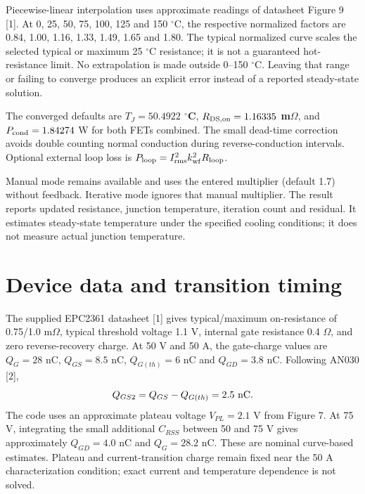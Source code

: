 \documentclass[11pt,a4paper]{article}
\begin{document}
Piecewise-linear interpolation uses approximate readings of datasheet Figure 9 [1].
At 0, 25, 50, 75, 100, 125 and 150 $^\circ$C, the respective normalized factors are
0.84, 1.00, 1.16, 1.33, 1.49, 1.65 and 1.80.
The typical normalized curve scales the selected typical or maximum 25 $^\circ$C
resistance; it is not a guaranteed hot-resistance limit. No extrapolation is made
outside 0--150 $^\circ$C. Leaving that range or failing to converge produces an
explicit error instead of a reported steady-state solution.

The converged defaults are \textbf{$T_J=50.4922$ $^\circ$C},
\textbf{$R_{\rm DS,on}=1.16335$ m$\Omega$}, and $P_{\rm cond}=1.84274$ W
for both FETs combined. The small dead-time correction avoids double counting
normal conduction during reverse-conduction intervals. Optional external loop loss
is $P_{\rm loop}=I_{\rm rms}^{2}k_{\rm wf}^{2}R_{\rm loop}$.

Manual mode remains available and uses the entered multiplier (default 1.7) without
feedback. Iterative mode ignores that manual multiplier. The result reports updated
resistance, junction temperature, iteration count and residual. It estimates
steady-state temperature under the specified cooling conditions; it does not measure
actual junction temperature.

\newpage
\section{Device data and transition timing}
The supplied EPC2361 datasheet [1] gives typical/maximum on-resistance of
0.75/1.0 m$\Omega$, typical threshold voltage 1.1 V, internal gate resistance
0.4 $\Omega$, and zero reverse-recovery charge. At 50 V and 50 A, the gate-charge
values are $Q_G=28$ nC, $Q_{GS}=8.5$ nC, $Q_{G(th)}=6$ nC and $Q_{GD}=3.8$ nC.
Following AN030 [2],
\[
 Q_{GS2}=Q_{GS}-Q_{G(th)}=2.5\ {\rm nC}.
\]
The code uses an approximate plateau voltage $V_{PL}=2.1$ V from Figure 7.
At 75 V, integrating the small additional $C_{RSS}$ between 50 and 75 V gives
approximately $Q_{GD}=4.0$ nC and $Q_G=28.2$ nC. These are nominal curve-based
estimates. Plateau and current-transition charge remain fixed near the 50 A
characterization condition; exact current and temperature dependence is not solved.
\end{document}
